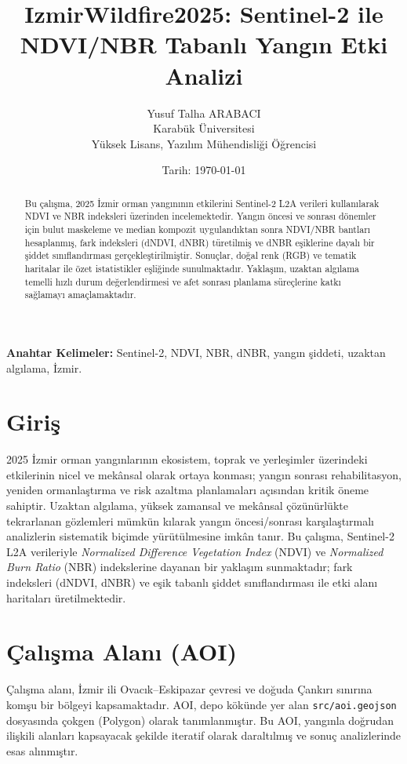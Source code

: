 \documentclass[11pt,a4paper]{article}
\title{IzmirWildfire2025: Sentinel-2 ile NDVI/NBR Tabanlı Yangın Etki Analizi}
\author{Yusuf Talha ARABACI\\Karabük Üniversitesi\\Yüksek Lisans, Yazılım Mühendisliği Öğrencisi}
\date{Tarih: \today}
\begin{document}
\sloppy
\maketitle
\thispagestyle{empty}

\clearpage
\tableofcontents
\clearpage

\renewcommand{\abstractname}{Özet}
\begin{abstract}
Bu çalışma, 2025 İzmir orman yangınının etkilerini Sentinel-2 L2A verileri kullanılarak
NDVI ve NBR indeksleri üzerinden incelemektedir. Yangın öncesi ve sonrası dönemler için
bulut maskeleme ve median kompozit uygulandıktan sonra NDVI/NBR bantları hesaplanmış,
fark indeksleri (dNDVI, dNBR) türetilmiş ve dNBR eşiklerine dayalı bir şiddet sınıflandırması
gerçekleştirilmiştir. Sonuçlar, doğal renk (RGB) ve tematik haritalar ile özet istatistikler
eşliğinde sunulmaktadır. Yaklaşım, uzaktan algılama temelli hızlı durum değerlendirmesi ve
afet sonrası planlama süreçlerine katkı sağlamayı amaçlamaktadır.
\end{abstract}

\noindent\textbf{Anahtar Kelimeler:} Sentinel-2, NDVI, NBR, dNBR, yangın şiddeti, uzaktan algılama, İzmir.

\clearpage

\section{Giriş}
2025 İzmir orman yangınlarının ekosistem, toprak ve yerleşimler üzerindeki etkilerinin
nicel ve mekânsal olarak ortaya konması; yangın sonrası rehabilitasyon, yeniden
ormanlaştırma ve risk azaltma planlamaları açısından kritik öneme sahiptir. Uzaktan
algılama, yüksek zamansal ve mekânsal çözünürlükte tekrarlanan gözlemleri mümkün kılarak
yangın öncesi/sonrası karşılaştırmalı analizlerin sistematik biçimde yürütülmesine imkân
tanır. Bu çalışma, Sentinel-2 L2A verileriyle \emph{Normalized Difference Vegetation Index}
(NDVI) ve \emph{Normalized Burn Ratio} (NBR) indekslerine dayanan bir yaklaşım
sunmaktadır; fark indeksleri (dNDVI, dNBR) ve eşik tabanlı şiddet sınıflandırması ile
etki alanı haritaları üretilmektedir.

\section{Çalışma Alanı (AOI)}
Çalışma alanı, İzmir ili Ovacık--Eskipazar çevresi ve doğuda Çankırı sınırına
komşu bir bölgeyi kapsamaktadır. AOI, depo kökünde yer alan \texttt{src/aoi.geojson}
dosyasında çokgen (Polygon) olarak tanımlanmıştır. Bu AOI, yangınla doğrudan ilişkili
alanları kapsayacak şekilde iteratif olarak daraltılmış ve sonuç analizlerinde esas
alınmıştır.
\end{document}
